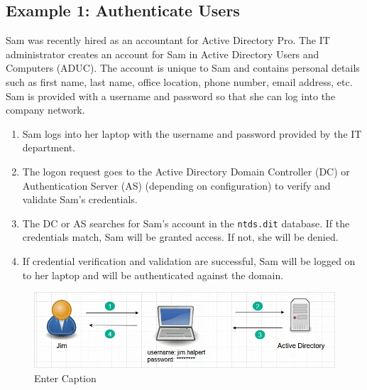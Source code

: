 \subsection{Example 1: Authenticate Users}
Sam was recently hired as an accountant for Active Directory Pro. The IT administrator creates an account for Sam in Active Directory Users and Computers (ADUC). The account is unique to Sam and contains personal details such as first name, last name, office location, phone number, email address, etc. Sam is provided with a username and password so that she can log into the company network.
\begin{enumerate}
    \item Sam logs into her laptop with the username and password provided by the IT department.
    \item The logon request goes to the Active Directory Domain Controller (DC) or Authentication Server (AS) (depending on configuration) to verify and validate Sam's credentials.
    \item The DC or AS searches for Sam's account in the \texttt{ntds.dit} database. If the credentials match, Sam will be granted access. If not, she will be denied.
    \item If credential verification and validation are successful, Sam will be logged on to her laptop and will be authenticated against the domain.
\end{enumerate}
\begin{figure}
    \centering
    \includegraphics[width=0.75\linewidth]{domauth.png}
    \caption{Enter Caption}
    \label{fig:placeholder}
\end{figure}

